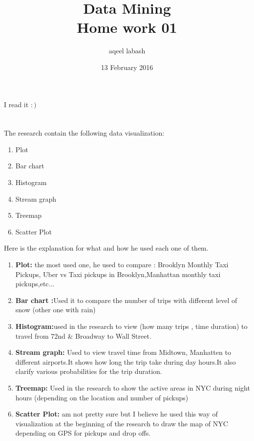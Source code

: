 \documentclass{article}
\title{Data Mining\\
	 Home work 01}
\author{aqeel labash}
\date{13 February 2016}
\begin{document}
	
	\maketitle
	\section*{}
	I read it \(:) \)
	\section*{}
	The research contain the following data visualization:
		\begin{enumerate}
			\item Plot
			\item Bar chart
			\item Histogram
			\item Stream graph
			\item Treemap
			\item Scatter Plot
		\end{enumerate}
Here is the explanation for what and how he used each one of them.
		\begin{enumerate}
			\item \textbf{Plot: }the most used one, he used to compare : Brooklyn Monthly Taxi Pickups, Uber vs Taxi pickups in Brooklyn,Manhattan monthly taxi pickups,etc...
			\item \textbf{Bar chart :}Used it to compare the number of trips with different level of snow (other one with rain)
			\item \textbf{Histogram:}used in the research to view (how many trips , time duration) to travel from 72nd \& Broadway to Wall Street.
			\item \textbf{ Stream graph:} Used to view travel time from Midtown, Manhatten to different airports.It shows how long the trip take during day hours.It also clarify  various probabilities for the trip duration.
			\item \textbf{Treemap:} Used in the research to show the active areas in NYC during night hours (depending on the location and number of pickups)
			\item \textbf{Scatter Plot:} am not pretty sure but I believe he used this way of visualization at the beginning  of the research to draw the map of NYC depending on GPS for pickups and drop offs.
		\end{enumerate} 
\end{document}
